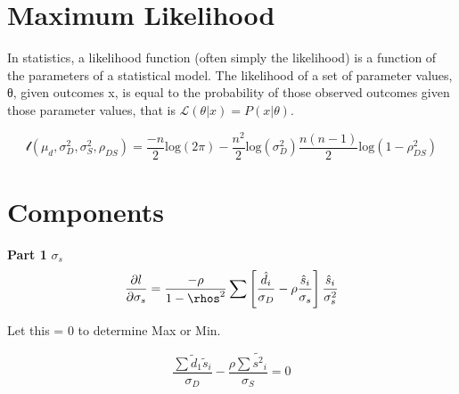 \section{Maximum Likelihood}

In statistics, a likelihood function (often simply the likelihood) is a function of the parameters of a statistical model. 
The likelihood of a set of parameter values, θ, given outcomes x, is equal to the probability of those 
observed outcomes given those parameter values, that is $\mathcal{L}(\theta |x) = P(x | \theta)$.


\[ \mathcal{l} (\mu_d,\sigma^2_D,\sigma^2_S,\rho_{DS}) 
= \frac{-n}{2}\mbox{log}(2\pi)  - \frac{n^2}{2}\mbox{log}(\sigma^2_D) 
\frac{n(n-1)}{2}\mbox{log}(1-\rho^2_{DS})

\]

\section{Components}
\newline
\textbf{Part 1} $\sigma_s$ \\

\[ \frac{ \partial l}{\partial \sigma_s}  
= \frac{-\rho}{1-\rhos^2} \sum \left[ \frac{\hat{d}_i}{\sigma_D}  -\rho \frac{\hat{s}_i}{\sigma_s} \right] 
\frac{\hat{s}_i}{\sigma^2_s} \]

Let this = 0 to determine Max or Min.

\[ \frac{\sum \tilde{d}_1 \tilde{s}_i}{\sigma_D}  - \frac{\rho \sum \tilde{s^2}_i}{\sigma_S} = 0  \]


